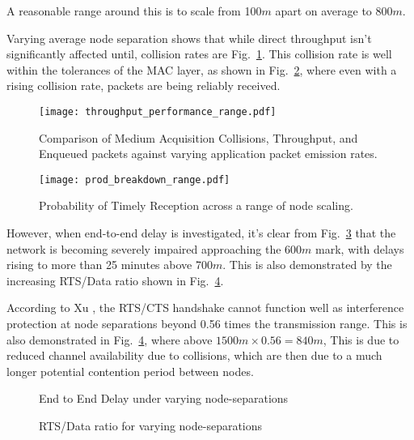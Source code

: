 A reasonable range around this is to scale from 100$m$ apart on average to 800$m$.

Varying average node separation shows that while direct throughput isn't significantly affected until, collision rates are Fig.~\ref{fig:throughput_performance_range}.
This collision rate is well within the tolerances of the MAC layer, as shown in Fig.~\ref{fig:prod_breakdown_range}, where even with a rising collision rate, packets are being reliably received.

\begin{figure}[H]
	\centering
	\texttt{[image: throughput\_performance\_range.pdf]}
	\caption{Comparison of Medium Acquisition Collisions, Throughput, and Enqueued packets against varying application packet emission rates.}
	\label{fig:throughput_performance_range}
\end{figure}

\begin{figure}[H]
	\centering
	\texttt{[image: prod\_breakdown\_range.pdf]}
	\caption{Probability of Timely Reception across a range of node scaling.}
	\label{fig:prod_breakdown_range}
\end{figure}

However, when end-to-end delay is investigated, it's clear from Fig.~\ref{fig:delay_range} that the network is becoming severely impaired approaching the 600$m$ mark, with delays rising to more than 25 minutes above 700$m$.
This is also demonstrated by the increasing RTS/Data ratio shown in Fig.~\ref{fig:rts_range}.

According to Xu \cite{Xu2002}, the RTS/CTS handshake cannot function well as interference protection at node separations beyond 0.56 times the transmission range. 
This is also demonstrated in  Fig.~\ref{fig:rts_range}, where above $1500m \times 0.56 = 840m$, 
This is due to reduced channel availability due to collisions, which are then due to a much longer potential contention period between nodes. 

\begin{figure}[H]
	\centering
	\caption{End to End Delay under varying node-separations}
	\label{fig:delay_range}
\end{figure}

\begin{figure}[H]
	\centering
	\caption{RTS/Data ratio for varying node-separations}
	\label{fig:rts_range}
\end{figure}


